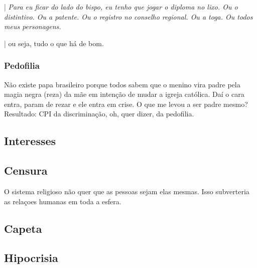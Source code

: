 \documentclass[12pt,a4paper]{article}
\begin{document}
			\begin{flushright}
			\end{flushright}

| \emph{Para eu ficar do lado do bispo, eu tenho que jogar o diploma no
lixo. Ou o distintivo. Ou a patente. Ou o registro no conselho regional.
 Ou a toga. Ou todos meus personagens.}

| ou seja, tudo o que h\'a de bom.

			\subsubsection{Pedofilia}
				\begin{flushright}
				\end{flushright}

			N\~ao existe papa brasileiro porque todos sabem que o menino vira padre pela magia negra (reza) da m\~ae em inten\c{c}\~ao de mudar a igreja cat\'olica. Da\'i o cara entra, param de rezar e ele entra em crise. O que me levou a ser padre mesmo? Resultado: CPI da discrimina\c{c}\~ao, oh, quer dizer, da pedofilia.

		\subsection{Interesses}
			\begin{flushright}
			\end{flushright}

		\subsection{Censura}
			\begin{flushright}
			\end{flushright}

			O sistema religioso n\~ao quer que as pessoas sejam elas mesmas. Isso subverteria as rela\c{c}oes humanas em toda a esfera.

		\subsection{Capeta}
			\begin{flushright}
			\end{flushright}

		\subsection{Hipocrisia}
			\begin{flushright}
			\end{flushright}
\end{document}
